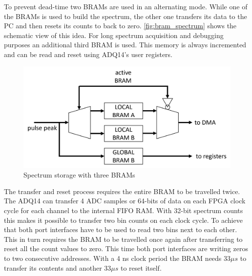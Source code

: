 To prevent dead-time two BRAMs are used in an alternating mode.
While one of the BRAMs is used to build the spectrum, the other one
transfers its data to the PC and then resets its counts to back to zero.
\autoref{fig:bram_spectrum} shows the schematic view of this idea. 
For long spectrum acquisition and debugging purposes an additional third BRAM is used. 
This memory is always incremented and can be read and reset using ADQ14's user registers.

\begin{figure}[H]
  \centering
  \includegraphics[width=\linewidth]{media/bram_spectrum.png}
  \caption{Spectrum storage with three BRAMs}
  \label{fig:bram_spectrum} 
\end{figure}

The transfer and reset process requires the entire BRAM to be travelled
twice. The ADQ14 can transfer 4 ADC samples or 64-bits of data on each FPGA clock cycle for each channel
to the internal FIFO RAM. With 32-bit spectrum counts this makes it possible
to transfer two bin counts on each clock cycle. To achieve that
both port interfaces have to be used to read two bins next to each other.
This in turn requires the BRAM to be travelled once again after transferring
to reset all the count values to zero. This time both port interfaces
are writing zeros to two consecutive addresses. With a 4 ns clock period
the BRAM needs 33$\mu s$ to transfer its contents and another 33$\mu s$ to reset itself.


